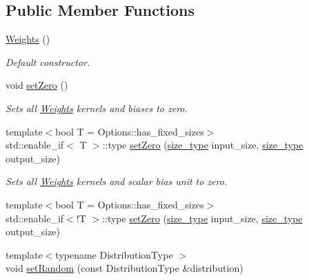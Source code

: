 \subsection*{Public Member Functions}
\begin{DoxyCompactItemize}
\item 
\hyperlink{classffnn_1_1layer_1_1fully__connected_1_1_weights_adfed6ebcda1671b18651fa448817eb23}{Weights} ()
\begin{DoxyCompactList}\small\item\em Default constructor. \end{DoxyCompactList}\item 
void \hyperlink{classffnn_1_1layer_1_1fully__connected_1_1_weights_a8727a71235138839d46c785b535bf23b}{set\-Zero} ()
\begin{DoxyCompactList}\small\item\em Sets all \hyperlink{classffnn_1_1layer_1_1fully__connected_1_1_weights}{Weights} kernels and biases to zero. \end{DoxyCompactList}\item 
{\footnotesize template$<$bool T = Options\-::has\-\_\-fixed\-\_\-sizes$>$ }\\std\-::enable\-\_\-if$<$ T $>$\-::type \hyperlink{classffnn_1_1layer_1_1fully__connected_1_1_weights_a2ce57cfffde02e760391b929685e7b71}{set\-Zero} (\hyperlink{namespaceffnn_a63b90a2fd70eb76684eac482a51633e5}{size\-\_\-type} input\-\_\-size, \hyperlink{namespaceffnn_a63b90a2fd70eb76684eac482a51633e5}{size\-\_\-type} output\-\_\-size)
\begin{DoxyCompactList}\small\item\em Sets all \hyperlink{classffnn_1_1layer_1_1fully__connected_1_1_weights}{Weights} kernels and scalar bias unit to zero. \end{DoxyCompactList}\item 
{\footnotesize template$<$bool T = Options\-::has\-\_\-fixed\-\_\-sizes$>$ }\\std\-::enable\-\_\-if$<$!T $>$\-::type \hyperlink{classffnn_1_1layer_1_1fully__connected_1_1_weights_aaef333db5c2b5fcf73e3eb6335b2d6d4}{set\-Zero} (\hyperlink{namespaceffnn_a63b90a2fd70eb76684eac482a51633e5}{size\-\_\-type} input\-\_\-size, \hyperlink{namespaceffnn_a63b90a2fd70eb76684eac482a51633e5}{size\-\_\-type} output\-\_\-size)
\item 
{\footnotesize template$<$typename Distribution\-Type $>$ }\\void \hyperlink{classffnn_1_1layer_1_1fully__connected_1_1_weights_aeaa3b146b866244465e4752b411d60eb}{set\-Random} (const Distribution\-Type \&distribution)

\end{DoxyCompactItemize}
